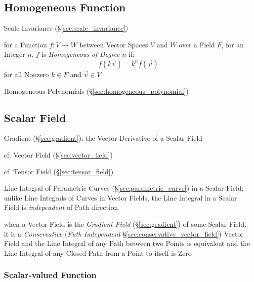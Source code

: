 \subsection{Homogeneous Function}\label{sec:homogeneous_function}

Scale Invariance (\S\ref{sec:scale_invariance})

for a Function $f : V \rightarrow W$ between Vector Spaces $V$ and $W$ over a
Field $F$, for an Integer $n$, $f$ is \emph{Homogeneous of Degree $n$} if:
\[
  f(k{\vec{v}}) = k^n f(\vec{v})
\]
for all Nonzero $k \in F$ and $\vec{v} \in V$

Homogeneous Polynomials (\S\ref{sec:homogeneous_polynomial})



\subsection{Scalar Field}\label{sec:scalar_field}


Gradient (\S\ref{sec:gradient}): the Vector Derivative of a Scalar Field

cf. Vector Field (\S\ref{sec:vector_field})

cf. Tensor Field (\S\ref{sec:tensor_field})

Line Integral of Parametric Curves (\S\ref{sec:parametric_curve}) in a Scalar
Field; unlike Line Integrals of Curves in Vector Fields, the Line Integral in a
Scalar Field is \emph{independent} of Path direction

when a Vector Field is the \emph{Gradient Field} (\S\ref{sec:gradient}) of some
Scalar Field, it is a \emph{Conservative} (\emph{Path Independent}
\S\ref{sec:conservative_vector_field}) Vector Field and the Line Integral of
any Path between two Points is equivalent and the Line Integral of any Closed
Path from a Point to itself is Zero



\subsubsection{Scalar-valued Function}\label{sec:scalar_function}

